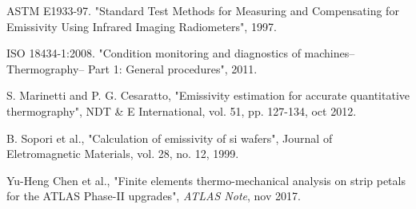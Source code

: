 \begin{enumerate}[label={[\arabic*]}]
		\item ASTM E1933-97. "Standard Test Methods for Measuring and Compensating for Emissivity Using Infrared Imaging Radiometers", 1997.\label{ref10}
		
		\item ISO 18434-1:2008. "Condition monitoring and diagnostics of machines–Thermography– Part 1: General procedures", 2011.\label{ref11}
		
		\item S. Marinetti and P. G. Cesaratto, "Emissivity estimation for accurate quantitative thermography", NDT \& E International, vol. 51, pp. 127-134, oct 2012.\label{ref12}
		
		\item B. Sopori et al., "Calculation of emissivity of si wafers", Journal of Eletromagnetic Materials, vol. 28, no. 12, 1999.\label{ref13}
		
		\item Yu-Heng Chen et al., "Finite elements thermo-mechanical analysis on strip petals for the ATLAS Phase-II upgrades", \textit{ATLAS Note}, nov 2017.\label{ref14}
	\end{enumerate}